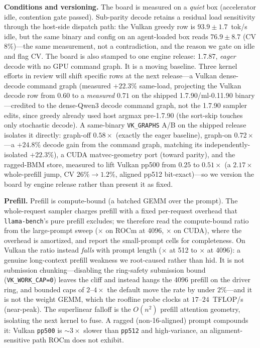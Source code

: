 \documentclass[11pt]{article}
\begin{document}
\textbf{Conditions and versioning.} The board is measured on a \emph{quiet} box (accelerator
idle, contention gate passed). Sub-parity decode retains a residual load sensitivity through
the host-side dispatch path: the Vulkan greedy row is $93.9{\pm}1.7$~tok/s idle, but the same
binary and config on an agent-loaded box reads $76.9{\pm}8.7$ (CV $8\%$)---the same
measurement, not a contradiction, and the reason we gate on idle and flag CV. The board is
also stamped to one engine release: 1.7.87, \emph{eager} decode with no GPU command graph. It
is a moving baseline. Three kernel efforts in review will shift specific rows at the next
release---a Vulkan dense-decode command graph (measured $+22.3\%$ same-load, projecting the
Vulkan decode row from $0.60$ to a \emph{measured} $0.71$ on the shipped 1.7.90/ml-0.11.90 binary---credited to the dense-Qwen3 decode command graph, not the 1.7.90 sampler edits, since greedy already used host argmax pre-1.7.90 (the sort-skip touches only stochastic decode). A same-binary \texttt{VK\_GRAPHS} A/B on the shipped release isolates it directly: graph-off $0.58\times$ (exactly the eager baseline), graph-on $0.72\times$---a $+24.8\%$ decode gain from the command graph, matching its independently-isolated $+22.3\%$), a CUDA matvec-geometry port (toward
parity), and the ragged-BMM store, measured to lift Vulkan pp500 from $0.25$ to $0.51\times$ (a $2.17\times$ whole-prefill jump, CV $26\%\!\to\!1.2\%$, aligned pp512 bit-exact)---so
we version the board by engine release rather than present it as fixed.

\textbf{Prefill.} Prefill is compute-bound (a batched GEMM over the prompt). The whole-request
sampler charges prefill with a fixed per-request overhead that \texttt{llama-bench}'s pure
prefill excludes; we therefore read the compute-bound ratio from the large-prompt sweep
(\rRocmPrefillMaxR$\times$ on ROCm at 4096, \rCudaPrefillMaxR$\times$ on CUDA), where the
overhead is amortized, and report the small-prompt cells for completeness. On Vulkan the
ratio instead \emph{falls} with prompt length (\rVulkanPrefillR$\times$ at 512 to
\rVulkanPrefillMaxR$\times$ at 4096): a genuine long-context prefill weakness we root-caused
rather than hid. It is not submission chunking---disabling the ring-safety submission bound
(\texttt{VK\_WORK\_CAP=0}) leaves the cliff and instead hangs the 4096 prefill on the driver
ring, and bounded caps of $2\text{--}4\times$ the default move the rate by under $2\%$---and
it is not the weight GEMM, which the roofline probe clocks at $17\text{--}24$~TFLOP/s
(near-peak). The superlinear falloff is the $O(n^2)$ prefill attention geometry, isolating
the next kernel to fuse. A ragged (non-16-aligned) prompt compounds it: Vulkan
\texttt{pp500} is $\sim3\times$ slower than \texttt{pp512} and high-variance, an
alignment-sensitive path ROCm does not exhibit.
\end{document}
